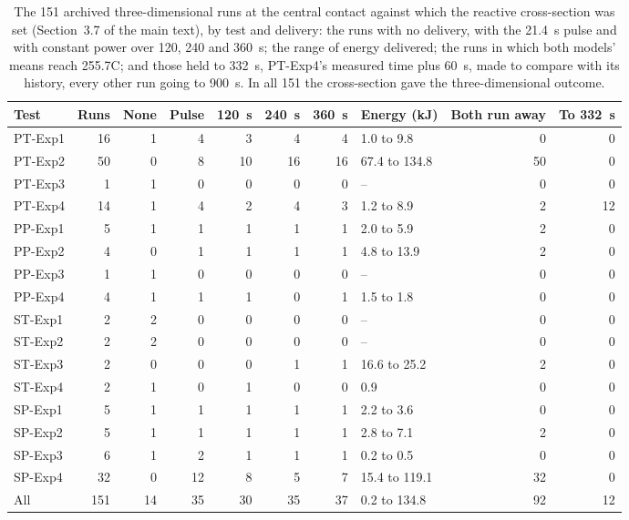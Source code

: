 \begin{table}[!htbp]
\centering
\footnotesize
\caption{The 151 archived three-dimensional runs at the central contact against which the reactive cross-section was set (Section~3.7 of the main text), by test and delivery: the runs with no delivery, with the 21.4~s pulse and with constant power over 120, 240 and 360~s; the range of energy delivered; the runs in which both models' means reach 255.7\textdegree C; and those held to 332~s, PT-Exp4's measured time plus 60~s, made to compare with its history, every other run going to 900~s. In all 151 the cross-section gave the three-dimensional outcome.}
\label{tab:s-archived}
\setlength{\tabcolsep}{2.5pt}
\begin{tabular}{lrrrrrr@{\hspace{9pt}}lrr}
\toprule
Test & Runs & None & Pulse & 120~s & 240~s & 360~s & Energy (kJ) & Both run away & To 332~s \\
\midrule
PT-Exp1 & 16 & 1 & 4 & 3 & 4 & 4 & 1.0 to 9.8 & 0 & 0 \\
PT-Exp2 & 50 & 0 & 8 & 10 & 16 & 16 & 67.4 to 134.8 & 50 & 0 \\
PT-Exp3 & 1 & 1 & 0 & 0 & 0 & 0 & -- & 0 & 0 \\
PT-Exp4 & 14 & 1 & 4 & 2 & 4 & 3 & 1.2 to 8.9 & 2 & 12 \\
PP-Exp1 & 5 & 1 & 1 & 1 & 1 & 1 & 2.0 to 5.9 & 2 & 0 \\
PP-Exp2 & 4 & 0 & 1 & 1 & 1 & 1 & 4.8 to 13.9 & 2 & 0 \\
PP-Exp3 & 1 & 1 & 0 & 0 & 0 & 0 & -- & 0 & 0 \\
PP-Exp4 & 4 & 1 & 1 & 1 & 0 & 1 & 1.5 to 1.8 & 0 & 0 \\
ST-Exp1 & 2 & 2 & 0 & 0 & 0 & 0 & -- & 0 & 0 \\
ST-Exp2 & 2 & 2 & 0 & 0 & 0 & 0 & -- & 0 & 0 \\
ST-Exp3 & 2 & 0 & 0 & 0 & 1 & 1 & 16.6 to 25.2 & 2 & 0 \\
ST-Exp4 & 2 & 1 & 0 & 1 & 0 & 0 & 0.9 & 0 & 0 \\
SP-Exp1 & 5 & 1 & 1 & 1 & 1 & 1 & 2.2 to 3.6 & 0 & 0 \\
SP-Exp2 & 5 & 1 & 1 & 1 & 1 & 1 & 2.8 to 7.1 & 2 & 0 \\
SP-Exp3 & 6 & 1 & 2 & 1 & 1 & 1 & 0.2 to 0.5 & 0 & 0 \\
SP-Exp4 & 32 & 0 & 12 & 8 & 5 & 7 & 15.4 to 119.1 & 32 & 0 \\
\midrule
All & 151 & 14 & 35 & 30 & 35 & 37 & 0.2 to 134.8 & 92 & 12 \\
\bottomrule
\end{tabular}
\end{table}
